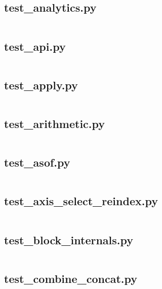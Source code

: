 \documentclass{article}
\begin{document}
\subsection{test\_analytics.py}
\inputminted{python}{/home/dufferzafar/dev/@clones/pandas/pandas/tests/frame/test_analytics.py}
\newpage

\subsection{test\_api.py}
\inputminted{python}{/home/dufferzafar/dev/@clones/pandas/pandas/tests/frame/test_api.py}
\newpage

\subsection{test\_apply.py}
\inputminted{python}{/home/dufferzafar/dev/@clones/pandas/pandas/tests/frame/test_apply.py}
\newpage

\subsection{test\_arithmetic.py}
\inputminted{python}{/home/dufferzafar/dev/@clones/pandas/pandas/tests/frame/test_arithmetic.py}
\newpage

\subsection{test\_asof.py}
\inputminted{python}{/home/dufferzafar/dev/@clones/pandas/pandas/tests/frame/test_asof.py}
\newpage

\subsection{test\_axis\_select\_reindex.py}
\inputminted{python}{/home/dufferzafar/dev/@clones/pandas/pandas/tests/frame/test_axis_select_reindex.py}
\newpage

\subsection{test\_block\_internals.py}
\inputminted{python}{/home/dufferzafar/dev/@clones/pandas/pandas/tests/frame/test_block_internals.py}
\newpage

\subsection{test\_combine\_concat.py}
\inputminted{python}{/home/dufferzafar/dev/@clones/pandas/pandas/tests/frame/test_combine_concat.py}
\newpage
\end{document}
